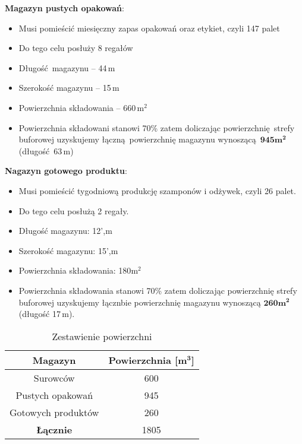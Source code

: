 \textbf{Magazyn pustych opakowań}:
\begin{itemize}
	\item Musi pomieścić miesięczny zapas opakowań oraz etykiet, czyli 147 palet
	\item Do tego celu posłuży 8 regałów
	\item Długość magazynu -- 44\,m
	\item Szerokość magazynu -- 15\,m
	\item Powierzchnia składowania -- 660\,$\mathrm{m^{2}}$
	\item Powierzchnia składowani stanowi 70\% zatem doliczając powierzchnię strefy buforowej uzyskujemy łączną powierzchnię magazynu wynoszącą $\mathbf{945m^{2}}$ (długość 63\,m)
\end{itemize}\vspace{\baselineskip}

\textbf{Nagazyn gotowego produktu}:
\begin{itemize}
	\item Musi pomieścić tygodniową produkcję szamponów i odżywek, czyli 26 palet.
	\item Do tego celu posłużą 2 regały.
	\item Długość magazynu: 12',m
	\item Szerokość magazynu: 15',m
	\item Powierzchnia składowania: 180$\mathrm{m^{2}}$
	\item Powierzchnia składowania stanowi 70\% zatem doliczając powierzchnię strefy buforowej uzyskujemy łącznbie powierzchnię magazynu wynoszącą $\mathbf{260m^{2}}$ (długość 17\,m).
\end{itemize}

\begin{table}[h]
	\centering
	\caption{Zestawienie powierzchni}
	\begin{tabular}{cc}
		\hline
		\textbf{Magazyn} & \textbf{Powierzchnia [$\mathbf{m^{3}}$]} \\
		\hline\hline
		Surowców & 600 \\
		Pustych opakowań & 945 \\
		Gotowych produktów & 260 \\
		\textbf{Łącznie} & 1805 \\
		\hline
	\end{tabular}
\end{table}

